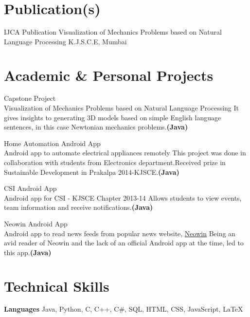\documentclass[10pt, a4paper, sans]{moderncv}
\begin{document}
\section{Publication(s)}
\cventry
{IJCA Publication 
\href{http://www.ijcaonline.org/archives/volume116/number14/20408-2766}{\faFile}}
{Visualization of Mechanics Problems based on
Natural Language Processing}
{K.J.S.C.E, Mumbai}
{}
{}
{}

\section{Academic \& Personal Projects}
\cventry
{Capstone Project \\ {\faGithub}}
{Visualization of Mechanics Problems based on
Natural Language Processing}
{}
{}
{}
{It gives insights to generating 3D models based on simple English language sentences, in this case Newtonian mechanics problems.\bfseries{(Java)}}

\cventry
{Home Automation Android App \\ {\faAndroid}}
{Android app to automate electrical appliances remotely}
{}
{}
{}
{This project was done in collaboration with students from Electronics department.Received  prize in Sustainable Development in Prakalpa 2014-KJSCE.\bfseries{(Java)}}

\cventry
{CSI Android App \\ {\faAndroid}}
{Android app for CSI - KJSCE Chapter 2013-14}
{}
{}
{}
{Allows students to view events, team information and receive notifications.\bfseries{(Java)}}

\cventry
{Neowin Android App \\ {\faAndroid}}
{Android app to read news feeds from popular news website, \href{http://www.neowin.net/}{Neowin}}
{}
{}
{}
{Being an avid reader of Neowin and the lack of an official Android app at the time, led to this app.\bfseries{(Java)}}


\section{Technical Skills}
\cvitem
{\bfseries{Languages}}
{Java, Python, C, C++, C\#, SQL, HTML, CSS, JavaScript, \LaTeX{}}
\end{document}
